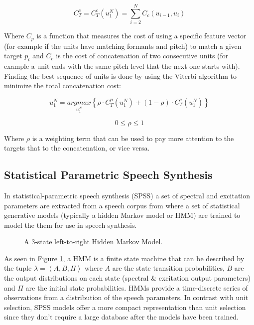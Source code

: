 \begin{equation}
    C_T^c = C_T^c (u_1^N) = \sum_{i = 2}^{N} C_c (u_{i-1}, u_i) 
    \label{eq:concat-cost}
\end{equation}

Where $C_p$ is a function that measures the cost of using a specific feature vector (for example if the units have matching formants and pitch) to match a given target $p_t$ and $C_c$ is the cost of concatenation of two consecutive units (for example a unit ends with the same pitch level that the next one starts with). Finding the best sequence of units is done by using the Viterbi algorithm to minimize the total concatenation cost:

\begin{equation}
    u_1^N= \underset{u_1^N}{argmax} \left \{ \rho \cdot C_T^p (u_1^N) + (1-\rho) \cdot C_T^c (u_1^N) \right \}
    \label{eq:unit-cost}
\end{equation}

\begin{equation}
    0 \le \rho \le 1
\end{equation}

Where $\rho$ is a weighting term that can be used to pay more attention to the targets that to the concatenation, or vice versa.

\subsection{Statistical Parametric Speech Synthesis}

In statistical-parametric speech synthesis (SPSS) a set of spectral and excitation parameters are extracted from a speech corpus from where a set of statistical generative models (typically a hidden Markov model or HMM) are trained to model the them for use in speech synthesis.

\begin{figure}[h]
    \centering

    

    \caption{A 3-state left-to-right Hidden Markov Model.}
    \label{fig:hmm}
\end{figure}

As seen in Figure \ref{fig:hmm}, a HMM is a finite state machine that can be described by the tuple $\lambda = \left < A, B, \Pi \right >$ where $A$ are the state transition probabilities, $B$ are the output distributions on each state (spectral \& excitation output parameters) and $\Pi$ are the initial state probabilities. HMMs provide a time-discrete series of observations from a distribution of the speech parameters. In contrast with unit selection, SPSS models offer a more compact representation than unit selection since they don't require a large database after the models have been trained.

